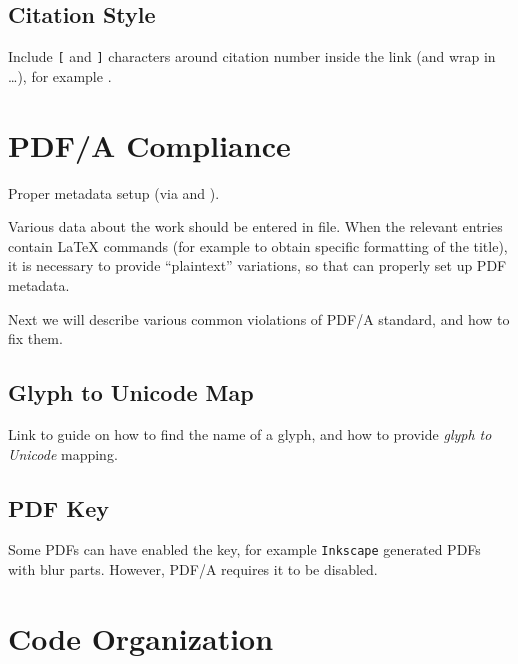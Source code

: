 \subsection{Citation Style}%
\label{sub:Citation Style}

Include \texttt{[} and \texttt{]} characters around citation number inside the link (and wrap in  \ldots), for example \autocite{TeXtured}.


\section{PDF/A Compliance}%
\label{sec:PDF/A Compliance}

Proper metadata setup (via  and \macro{\DocumentMetadata}).
\begin{remark}
    Various data about the work should be entered in  file.
    When the relevant entries contain \LaTeX{} commands (for example to obtain specific formatting of the title), it is necessary to provide \enquote{plaintext} variations, so that  can properly set up PDF metadata.
\end{remark}

Next we will describe various common violations of PDF/A standard, and how to fix them.

\subsection{Glyph to Unicode Map}%
\label{sub:Glyph to Unicode Map}

\begin{Todo}
    Link to guide on how to find the name of a glyph, and how to provide \emph{glyph to Unicode} mapping.
\end{Todo}

\subsection{PDF \texorpdfstring{}{/Interpolation} Key}%
\label{sub:PDF Interpolation Key}

Some PDFs can have enabled the  key, for example \texttt{Inkscape} generated PDFs with blur parts.
However, PDF/A requires it to be disabled.


\section{Code Organization}%
\label{sec:Code Organization}

